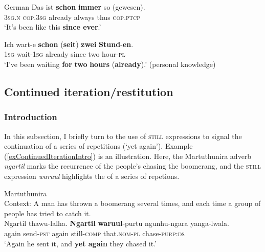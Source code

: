 \begin{exe}
	\ex 
	\begin{xlist}
		\exi{} German	
		\ex \label{exGermanSchonImmer}
		\gll Das ist \textbf{schon} \textbf{immer} so \textup{(}gewesen\textup{)}.\\
		3\textsc{sg}.\textsc{n} \textsc{cop}.3\textsc{sg} already always thus \phantom{(}\textsc{cop}.\textsc{ptcp}\\
		\glt \lq It's been like this \textbf{since ever}.\rq{}
		
		\ex \label{exGermanSchon2h}
		\gll Ich wart-e \textbf{schon} \textup{(}\textbf{seit}\textup{)} \textbf{zwei} \textbf{Stund}-\textbf{en}.\\
		1\textsc{sg} wait-1\textsc{sg} already \phantom{(}since two hour-\textsc{pl}\\
		\glt \lq I've been waiting \textbf{for} \textbf{two} \textbf{hours} (\textbf{already}).\rq{ }(personal knowledge)
	\end{xlist}
\end{exe}

\subsection{Continued iteration/restitution}
\label{sectionContinuedIteration}
\subsubsection{Introduction}
In this subsection, I briefly turn to the use of \textsc{still} expressions to signal the continuation of a series of repetitions (\lq yet again'). Example (\ref{exContinuedIterationIntro}) is an illustration. Here, the Martuthunira adverb \textit{ngartil} marks the recurrence of the people's chasing the boomerang, and the \textsc{still} expression \textit{waruul} highlights the  of a series of repetions.

\begin{exe}
	\ex Martuthunira\label{exContinuedIterationIntro}\\
	Context: A man has thrown a boomerang several times, and each time a group of people has tried to catch it.\\
	\gll Ngartil thawu-lalha. \textbf{Ngartil} \textbf{waruul}-purtu ngunhu-ngara yanga-lwala.\\
	again send-\textsc{pst} again still-\textsc{comp} that.\textsc{nom}-\textsc{pl} chase-\textsc{purp}:\textsc{ds}\\
	\glt \lq Again he sent it, and \textbf{yet again} they chased it.' \parencite[294–295]{Dench1994}
\end{exe}

